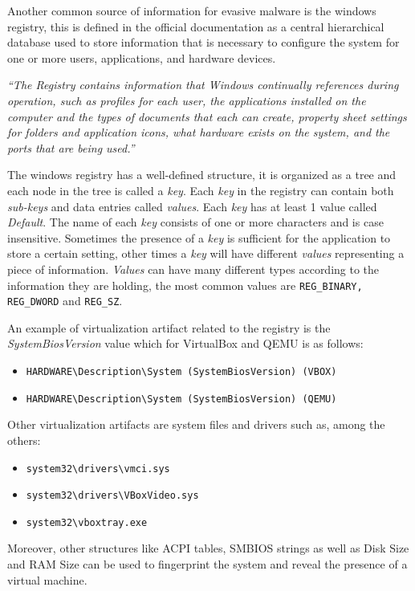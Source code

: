 Another common source of information for evasive malware is the windows registry, this is defined in the official documentation as a central hierarchical database used to store information that is necessary to configure the system for one or more users, applications, and hardware devices.

\textit{``The Registry contains information that Windows continually references during operation, such as profiles for each user, the applications installed on the computer and the types of documents that each can create, property sheet settings for folders and application icons, what hardware exists on the system, and the ports that are being used.''}~\cite{windocs}

The windows registry has a well-defined structure, it is organized as a tree and each node in the tree is called a \textit{key}. Each \textit{key} in the registry can contain both \textit{sub-keys} and data entries called \textit{values}. Each \textit{key} has at least 1 value called \textit{Default}. The name of each \textit{key} consists of one or more characters and is case insensitive. Sometimes the presence of a \textit{key} is sufficient for the application to store a certain setting, other times a \textit{key} will have different \textit{values} representing a piece of information. \textit{Values} can have many different types according to the information they are holding, the most common values are \lstinline{REG_BINARY, REG_DWORD} and \lstinline{REG_SZ}. 

An example of virtualization artifact related to the registry is the \textit{SystemBiosVersion} value which for VirtualBox and QEMU is as follows:
\begin{itemize}
    \item \lstinline{HARDWARE\Description\System (SystemBiosVersion) (VBOX)}
    \item \lstinline{HARDWARE\Description\System (SystemBiosVersion) (QEMU)} 
\end{itemize}

Other virtualization artifacts are system files and drivers such as, among the others:
\begin{itemize}
    \item \lstinline{system32\drivers\vmci.sys}
    \item \lstinline{system32\drivers\VBoxVideo.sys}
    \item \lstinline{system32\vboxtray.exe}
\end{itemize}

Moreover, other structures like ACPI tables, SMBIOS strings as well as Disk Size and RAM Size can be used to fingerprint the system and reveal the presence of a virtual machine. 



